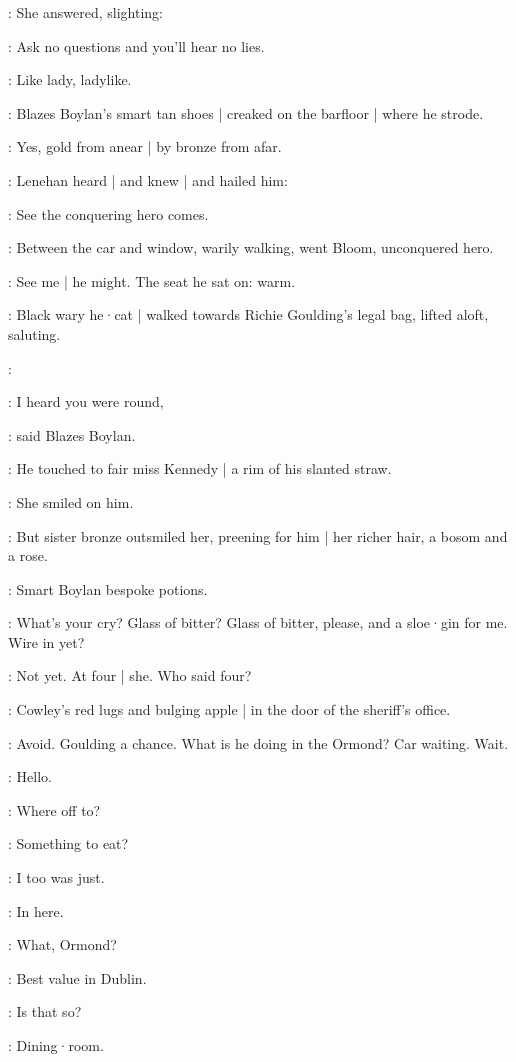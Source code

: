 :
She answered,
slighting:

\MissK:
Ask no questions and you'll hear no lies.

:
Like lady,
ladylike.

:
Blazes Boylan's smart tan shoes |
creaked on the barfloor |
where he strode.

:
Yes,
gold from anear |
by bronze from afar.

:
Lenehan heard |
and knew |
and hailed him:

\lenehan:
See the conquering hero comes.

:
Between the car and window,
warily walking,
went Bloom,
unconquered hero.

\BloomIntA:
See me |
he might.
The seat he sat on:
warm.

:
Black wary he·cat |
walked towards Richie Goulding's legal bag,
lifted aloft,
saluting.

\simon:

\boylan:
I heard you were round,

:
said Blazes Boylan.

:
He touched to fair miss Kennedy |
a rim of his slanted straw.

:
She smiled on him.

:
But sister bronze outsmiled her,
preening for him |
her richer hair,
a bosom
and a rose.

:
Smart Boylan bespoke potions.

\boylan:
What's your cry?
Glass of bitter?
Glass of bitter, please,
and a sloe·gin for me.
Wire in yet?

\BloomIntA:
Not yet.
At four |
she.
Who said four?

:
Cowley's red lugs and bulging apple |
in the door of the sheriff's office.

\BloomIntA:
Avoid.
Goulding a chance.
What is he doing in the Ormond?
Car waiting.
Wait.

\Bloom:
Hello.

\goulding:
Where off to?

\Bloom:
Something to eat?

\goulding:
I too was just.

\Bloom:
In here.

\goulding:
What,
Ormond?

\Bloom:
Best value in Dublin.

\goulding:
Is that so?

\Bloom:
Dining·room.

